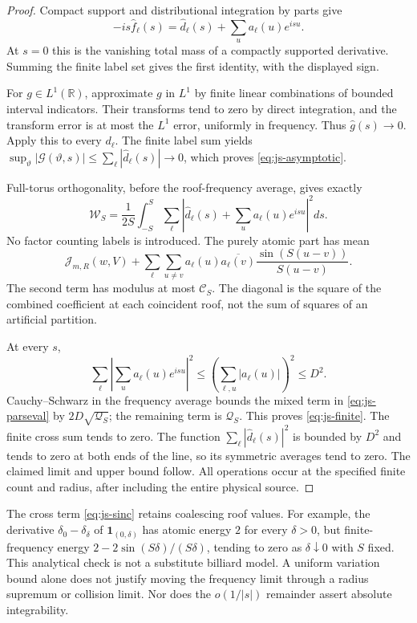 \begin{proof}
Compact support and distributional integration by parts give
\[
 -is\widehat f_\ell(s)=\widehat d_\ell(s)
                      +\sum_u a_\ell(u)e^{isu}.
\]
At $s=0$ this is the vanishing total mass of a compactly
supported derivative. Summing the finite label set gives the
first identity, with the displayed sign.

For $g\in L^1(\mathbb R)$, approximate $g$ in $L^1$ by finite
linear combinations of bounded interval indicators. Their
transforms tend to zero by direct integration, and the transform
error is at most the $L^1$ error, uniformly in frequency.
Thus $\widehat g(s)\to0$. Apply this to every $d_\ell$.
The finite label sum yields
$\sup_\vartheta|\mathcal G(\vartheta,s)|
 \le\sum_\ell|\widehat d_\ell(s)|\to0$,
which proves \eqref{eq:js-asymptotic}.

Full-torus orthogonality, before the roof-frequency average,
gives exactly
\begin{equation}\label{eq:js-parseval}
 \mathcal W_S=\frac1{2S}\int_{-S}^S\sum_\ell
 \left|\widehat d_\ell(s)+\sum_u a_\ell(u)e^{isu}\right|^2ds.
\end{equation}
No factor counting labels is introduced. The purely atomic
part has mean
\begin{equation}\label{eq:js-sinc}
 \mathcal J_{m,R}(w,V)+
 \sum_\ell\sum_{u\ne v}a_\ell(u)\overline{a_\ell(v)}
                 \frac{\sin(S(u-v))}{S(u-v)}.
\end{equation}
The second term has modulus at most $\mathcal C_S$.
The diagonal is the square of the combined coefficient at each
coincident roof, not the sum of squares of an artificial partition.

At every $s$,
\[
 \sum_\ell\left|\sum_u a_\ell(u)e^{isu}\right|^2
 \le\left(\sum_{\ell,u}|a_\ell(u)|\right)^2\le D^2.
\]
Cauchy--Schwarz in the frequency average bounds the mixed
term in \eqref{eq:js-parseval} by $2D\sqrt{\mathcal Q_S}$;
the remaining term is $\mathcal Q_S$. This proves
\eqref{eq:js-finite}. The finite cross sum tends to zero.
The function $\sum_\ell|\widehat d_\ell(s)|^2$ is bounded by
$D^2$ and tends to zero at both ends of the line, so its
symmetric averages tend to zero. The claimed limit and upper
bound follow. All operations occur at the specified finite
count and radius, after including the entire physical source.
\end{proof}

\begin{remark}
\label{rem:js-coalescence}
The cross term \eqref{eq:js-sinc} retains coalescing roof values.
For example, the derivative $\delta_0-\delta_\delta$ of
$\mathbf1_{(0,\delta)}$ has atomic energy $2$ for every
$\delta>0$, but finite-frequency energy
$2-2\sin(S\delta)/(S\delta)$, tending to zero as
$\delta\downarrow0$ with $S$ fixed. This analytical check is
not a substitute billiard model. A uniform variation bound
alone does not justify moving the frequency limit through a
radius supremum or collision limit. Nor does the
$o(1/|s|)$ remainder assert absolute integrability.
\end{remark}


